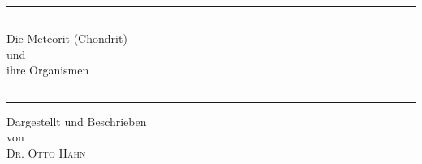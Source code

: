 \documentclass[a4paper, 11pt, oneside]{article}
\begin{document}
\swabfamily
\renewcommand{\contentsname}{
\swabfamily{Inhaltsverzeichnis}
}
\renewcommand{\listfigurename}{
\swabfamily{Abbildungsverzeichnis}
}
\let\origcftsecfont\cft
\let\origcftsecpagefont\cftsecpagefont
\let\origcftsecafterpnum\cftsecafterpnum
\renewcommand{\cftsecpagefont}{\swabfamily{\origcftsecpagefont}}
\renewcommand{\cftsecafterpnum}{\swabfamily{\origcftsecafterpnum}}
\let\origcftsubsecpagefont\cftsubsecpagefont
\let\origcftsubsecafterpnum\cftsubsecafterpnum
\renewcommand{\cftsubsecpagefont}{\swabfamily{\origcftsubsecpagefont}}
\renewcommand{\cftsubsecafterpnum}{\swabfamily{\origcftsubsecafterpnum}}

\begin{titlepage} %
	\centering %
	\scshape %

	
	\rule{\textwidth}{1.6pt}\vspace*{-\baselineskip}\vspace*{2pt} %
	\rule{\textwidth}{0.4pt} %
	
	\vspace{0.75\baselineskip} %
	
	{\Huge Die Meteorit (Chondrit)\\ und\\ ihre Organismen\\} %
	
	\vspace{0.75\baselineskip} %
	
	\rule{\textwidth}{0.4pt}\vspace*{-\baselineskip}\vspace{3.2pt} %
	\rule{\textwidth}{1.6pt} %
	
	\vspace{1\baselineskip} %
	
	
	{\Large Dargestellt und Beschrieben\\ von\\ \scshape\Large Dr. Otto Hahn\\} %
	

\end{titlepage}
\end{document}
